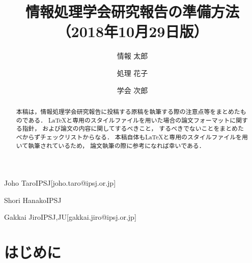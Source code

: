 \documentclass[submit,techrep,noauthor]{ipsj}
\begin{document}
\title{情報処理学会研究報告の準備方法\\
	（2018年10月29日版）}




\author{情報 太郎}{Joho Taro}{IPSJ}[joho.taro@ipsj.or.jp]
\author{処理 花子}{Shori Hanako}{IPSJ}
\author{学会 次郎}{Gakkai Jiro}{IPSJ,JU}[gakkai.jiro@ipsj.or.jp]

\begin{abstract}
本稿は，情報処理学会研究報告に投稿する原稿を執筆する際の注意点等をまとめたものである．
\LaTeX と専用のスタイルファイルを用いた場合の論文フォーマットに関する指針，
および論文の内容に関してするべきこと，
するべきでないことをまとめたべからずチェックリストからなる．
本稿自体も\LaTeX と専用のスタイルファイルを用いて執筆されているため，
論文執筆の際に参考になれば幸いである．
\end{abstract}

%
%
%

\maketitle

\section{はじめに}
\end{document}
